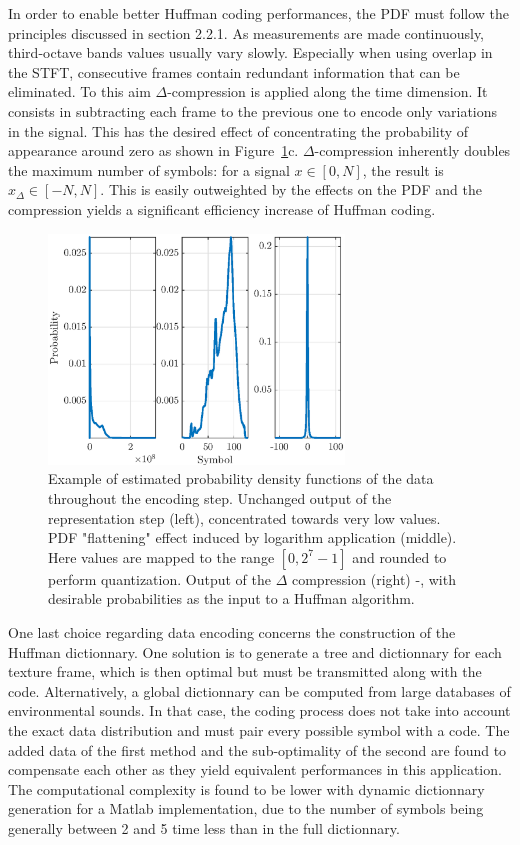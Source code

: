 \documentclass[12pt,times,onecolumn]{article}
\begin{document}
In order to enable better Huffman coding performances, the PDF must follow the principles discussed in section 2.2.1. As measurements are made continuously, third-octave bands values usually vary slowly. Especially when using overlap in the STFT, consecutive frames contain redundant information that can be eliminated. To this aim $\Delta$-compression is applied along the time dimension. It consists in subtracting each frame to the previous one to encode only variations in the signal. This has the desired effect of concentrating the probability of appearance around zero as shown in Figure~\ref{fig:pdf}c. $\Delta$-compression inherently doubles the maximum number of symbols: for a signal $x\in [0, N]$, the result is $x_\Delta \in [-N, N]$. This is easily outweighted by the effects on the PDF and the compression yields a significant efficiency increase of Huffman coding.\\

\begin{figure}[htbp]
	\centering
		\includegraphics[width=0.7\textwidth]{figures/pdf.eps}
	\caption{Example of estimated probability density functions of the data throughout the encoding step. Unchanged output of the representation step (left), concentrated towards very low values. PDF "flattening" effect induced by logarithm application (middle). Here values are mapped to the range $[0, 2^7-1]$ and rounded to perform quantization. Output of the $\Delta$ compression (right) -, with desirable probabilities as the input to a Huffman algorithm.}
	\label{fig:pdf}
\end{figure}

One last choice regarding data encoding concerns the construction of the Huffman dictionnary. One solution is to generate a tree and dictionnary for each texture frame, which is then optimal but must be transmitted along with the code. Alternatively, a global dictionnary can be computed from large databases of environmental sounds. In that case, the coding process does not take into account the exact data distribution and must pair every possible symbol with a code. The added data of the first method and the sub-optimality of the second are found to compensate each other as they yield equivalent performances in this application. The computational complexity is found to be lower with dynamic dictionnary generation for a Matlab implementation, due to the number of symbols being generally between 2 and 5 time less than in the full dictionnary.
\end{document}
